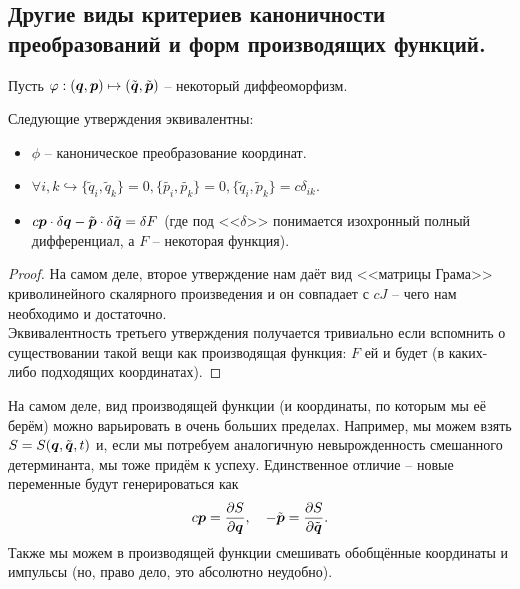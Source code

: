 \subsection{Другие виды критериев каноничности преобразований и форм производящих функций.}
Пусть $\varphi: (\boldsymbol{q}, \boldsymbol{p}) \mapsto (\tilde{\boldsymbol{q}}, \tilde{\boldsymbol{p}})$ -- некоторый диффеоморфизм.
\begin{theorem}
    Следующие утверждения эквивалентны:
    \begin{itemize}
        \item $\phi$ -- каноническое преобразование координат.
        \item $\forall i, k \hookrightarrow \{\tilde{q}_i, \tilde{q}_k\} = 0, \{\tilde{p_i}, \tilde{p_k}\} = 0, \{\tilde{q}_i, \tilde{p}_k\} = c\delta_{ik}$.
        \item $c\boldsymbol{p}\cdot\delta \boldsymbol{q} - \tilde{\boldsymbol{p}}\cdot \delta \tilde{\boldsymbol{q}} = \delta F$ (где под  <<$\delta$>> понимается изохронный полный дифференциал, а $F$ -- некоторая функция).
    \end{itemize}
\end{theorem}
\begin{proof}
    На самом деле, второе утверждение нам даёт вид <<матрицы Грама>> криволинейного скалярного произведения и он совпадает с $cJ$ -- чего нам необходимо и достаточно. \\
    Эквивалентность третьего утверждения получается тривиально если вспомнить о существовании такой вещи как производящая функция: $F$ ей и будет (в каких-либо подходящих координатах).
\end{proof}
На самом деле, вид производящей функции (и координаты, по которым мы её берём) можно варьировать в очень больших пределах.
Например, мы можем взять $S = S(\boldsymbol{q}, \tilde{\boldsymbol{q}}, t)$ и, если мы потребуем аналогичную невырожденность смешанного детерминанта, мы тоже придём к успеху.
Единственное отличие -- новые переменные будут генерироваться как
\[
    c\boldsymbol{p} = \dfrac{\partial S}{\partial \boldsymbol{q}}, \quad -\tilde{\boldsymbol{p}} = \dfrac{\partial S}{\partial \tilde{ \boldsymbol{q}}}.
\]
Также мы можем в производящей функции смешивать обобщённые координаты и импульсы (но, право дело, это абсолютно неудобно).
